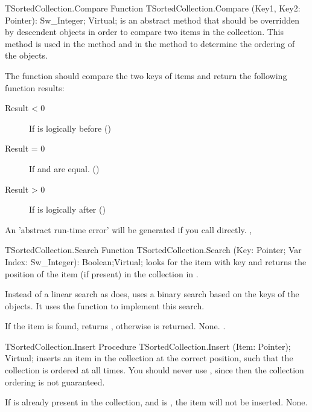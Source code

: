 \begin{function}{TSortedCollection.Compare}
\Declaration
Function TSortedCollection.Compare (Key1, Key2: Pointer): Sw\_Integer; Virtual;
\Description
{} is an abstract method that should be overridden by descendent
objects in order to compare two items in the collection. This method is used
in the  method and in the
 method to determine the ordering of
the objects.

The function should compare the two keys of items and return the following
function results:
\begin{description}
\item [Result < 0] If  is logically before 
()
\item [Result = 0] If  and  are equal. ()
\item [Result > 0] If  is logically after 
()
\end{description}
\Errors
An 'abstract run-time error' will be generated if you call
 directly.
\SeeAlso
{},
\end{function}

\begin{function}{TSortedCollection.Search}
\Declaration
Function TSortedCollection.Search (Key: Pointer; Var Index: Sw\_Integer): Boolean;Virtual;
\Description
{} looks for the item with key  and returns the position 
of the item (if present) in the collection in .

Instead of a linear search as  does, 
uses a binary search based on the keys of the objects. It uses the
 function to implement this
search. 

If the item is found,  returns , otherwise 
is returned.
\Errors
None.
\SeeAlso
{}.
\end{function}

\begin{procedure}{TSortedCollection.Insert}
\Declaration
Procedure TSortedCollection.Insert (Item: Pointer); Virtual;
\Description
{} inserts an item in the collection at the correct position, such
that the collection is ordered at all times. You should never use
, since then the collection ordering
is not guaranteed.

If  is already present in the collection, and  is
, the item will not be inserted.
\Errors
None.
\SeeAlso
{}
\end{procedure}

